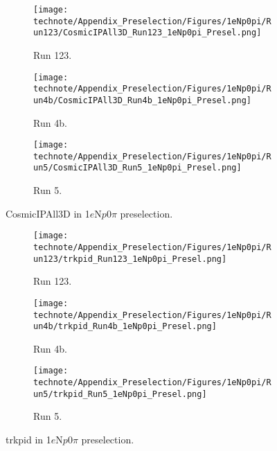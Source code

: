 \begin{figure}[H]
    \centering
    \begin{subfigure}[t]{0.32\linewidth}
        \texttt{[image: technote/Appendix\_Preselection/Figures/1eNp0pi/Run123/CosmicIPAll3D\_Run123\_1eNp0pi\_Presel.png]}
        \caption{Run 123.}
    \end{subfigure}%
    \hspace{0.2cm}%
    \begin{subfigure}[t]{0.32\linewidth}
        \texttt{[image: technote/Appendix\_Preselection/Figures/1eNp0pi/Run4b/CosmicIPAll3D\_Run4b\_1eNp0pi\_Presel.png]}
        \caption{Run 4b.}
    \end{subfigure}%
    \hspace{0.2cm}%
    \begin{subfigure}[t]{0.32\linewidth}
        \texttt{[image: technote/Appendix\_Preselection/Figures/1eNp0pi/Run5/CosmicIPAll3D\_Run5\_1eNp0pi\_Presel.png]}
        \caption{Run 5.}
    \end{subfigure}
    \caption{CosmicIPAll3D in 1$e$N$p$0$\pi$ preselection.}
\end{figure}

\begin{figure}[H]
    \centering
    \begin{subfigure}[t]{0.32\linewidth}
        \texttt{[image: technote/Appendix\_Preselection/Figures/1eNp0pi/Run123/trkpid\_Run123\_1eNp0pi\_Presel.png]}
        \caption{Run 123.}
    \end{subfigure}%
    \hspace{0.2cm}%
    \begin{subfigure}[t]{0.32\linewidth}
        \texttt{[image: technote/Appendix\_Preselection/Figures/1eNp0pi/Run4b/trkpid\_Run4b\_1eNp0pi\_Presel.png]}
        \caption{Run 4b.}
    \end{subfigure}%
    \hspace{0.2cm}%
    \begin{subfigure}[t]{0.32\linewidth}
        \texttt{[image: technote/Appendix\_Preselection/Figures/1eNp0pi/Run5/trkpid\_Run5\_1eNp0pi\_Presel.png]}
        \caption{Run 5.}
    \end{subfigure}
    \caption{trkpid in 1$e$N$p$0$\pi$ preselection.}
\end{figure}

